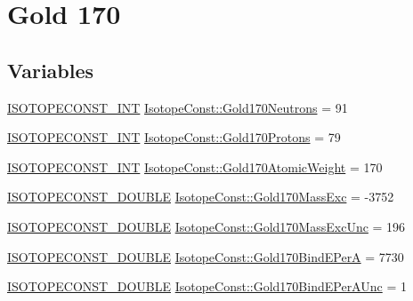 \hypertarget{group___isotope_const-_gold-_au170}{}\section{Gold 170}
\label{group___isotope_const-_gold-_au170}
\subsection*{Variables}
\begin{DoxyCompactItemize}
\item 
\mbox{\hyperlink{group___isotope_const-_macros_ga5f18360b3e99483a35c32d789e62621c}{I\+S\+O\+T\+O\+P\+E\+C\+O\+N\+S\+T\+\_\+\+I\+NT}} \mbox{\hyperlink{group___isotope_const-_gold-_au170_ga1f4ba9b871b5be767ff20c504904aae9}{Isotope\+Const\+::\+Gold170\+Neutrons}} = 91
\item 
\mbox{\hyperlink{group___isotope_const-_macros_ga5f18360b3e99483a35c32d789e62621c}{I\+S\+O\+T\+O\+P\+E\+C\+O\+N\+S\+T\+\_\+\+I\+NT}} \mbox{\hyperlink{group___isotope_const-_gold-_au170_gac7b4d257d7b3437b8e41b00cd636be9e}{Isotope\+Const\+::\+Gold170\+Protons}} = 79
\item 
\mbox{\hyperlink{group___isotope_const-_macros_ga5f18360b3e99483a35c32d789e62621c}{I\+S\+O\+T\+O\+P\+E\+C\+O\+N\+S\+T\+\_\+\+I\+NT}} \mbox{\hyperlink{group___isotope_const-_gold-_au170_ga9169b1a01456084595b1396533ecfa22}{Isotope\+Const\+::\+Gold170\+Atomic\+Weight}} = 170
\item 
\mbox{\hyperlink{group___isotope_const-_macros_ga8f45a7272ce02c0b4c65c44636ed719a}{I\+S\+O\+T\+O\+P\+E\+C\+O\+N\+S\+T\+\_\+\+D\+O\+U\+B\+LE}} \mbox{\hyperlink{group___isotope_const-_gold-_au170_ga873c91cb41f723bc2b0cc5b54d4e9ccc}{Isotope\+Const\+::\+Gold170\+Mass\+Exc}} = -\/3752
\item 
\mbox{\hyperlink{group___isotope_const-_macros_ga8f45a7272ce02c0b4c65c44636ed719a}{I\+S\+O\+T\+O\+P\+E\+C\+O\+N\+S\+T\+\_\+\+D\+O\+U\+B\+LE}} \mbox{\hyperlink{group___isotope_const-_gold-_au170_ga744b42f4a91f3e4158309db6b853470e}{Isotope\+Const\+::\+Gold170\+Mass\+Exc\+Unc}} = 196
\item 
\mbox{\hyperlink{group___isotope_const-_macros_ga8f45a7272ce02c0b4c65c44636ed719a}{I\+S\+O\+T\+O\+P\+E\+C\+O\+N\+S\+T\+\_\+\+D\+O\+U\+B\+LE}} \mbox{\hyperlink{group___isotope_const-_gold-_au170_ga6f0a0a6ab4d3933b88624c08f334be7f}{Isotope\+Const\+::\+Gold170\+Bind\+E\+PerA}} = 7730
\item 
\mbox{\hyperlink{group___isotope_const-_macros_ga8f45a7272ce02c0b4c65c44636ed719a}{I\+S\+O\+T\+O\+P\+E\+C\+O\+N\+S\+T\+\_\+\+D\+O\+U\+B\+LE}} \mbox{\hyperlink{group___isotope_const-_gold-_au170_ga5dc5cf85c79453985f1ec170effe7430}{Isotope\+Const\+::\+Gold170\+Bind\+E\+Per\+A\+Unc}} = 1

\end{DoxyCompactItemize}
